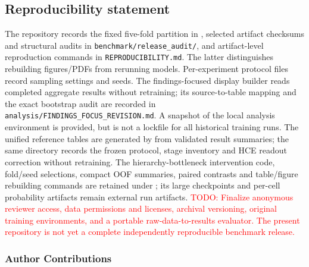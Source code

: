 \documentclass{article} %
\newcommand{\todo}[1]{\textcolor{red}{TODO: #1}}
\begin{document}

\subsection*{Reproducibility statement}

The repository records the fixed five-fold partition in
, selected artifact checksums and
structural audits in \texttt{benchmark/release\_audit/}, and artifact-level
reproduction commands in \texttt{REPRODUCIBILITY.md}. The latter distinguishes
rebuilding figures/PDFs from rerunning models. Per-experiment protocol files
record sampling settings and seeds. The findings-focused display builder
reads completed aggregate results without retraining; its source-to-table
mapping and the exact bootstrap audit are recorded in
\texttt{analysis/FINDINGS\_FOCUS\_REVISION.md}. A snapshot of the local analysis
environment is provided, but is not a lockfile for all historical training runs.
The unified reference tables are generated by
 from validated result summaries;
the same directory records the frozen protocol, stage inventory and HCE
readout correction without retraining.
The hierarchy-bottleneck intervention code, fold/seed selections, compact OOF
summaries, paired contrasts and table/figure rebuilding commands are retained
under ; its large checkpoints
and per-cell probability artifacts remain external run artifacts.
\todo{Finalize anonymous reviewer access, data permissions and licenses,
archival versioning, original training environments, and a portable
raw-data-to-results evaluator. The present repository is not yet a complete
independently reproducible benchmark release.}

\subsubsection*{Author Contributions}
\end{document}
